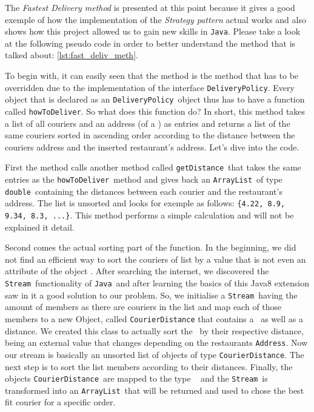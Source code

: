 The \emph{Fastest Delivery method} is presented at this point because it gives a good exemple of how the implementation of the \emph{Strategy pattern} actual works and also shows how this project allowed us to gain new skills in \lstinline|Java|. Please take a look at the following pseudo code in order to better understand the method that is talked about: 
\ref{lst:fast_deliv_meth}. 

To begin with, it can easily seen that the method is the method that has to be overridden due to the implementation of the interface \lstinline|DeliveryPolicy|. Every object that is declared as an \lstinline|DeliveryPolicy|~object thus has to have a function called \lstinline|howToDeliver|. So what does this function do? In short, this method takes a list of all couriers and an address (of a \Restaurant) as entries and returns a list of the same couriers sorted in ascending order according to the distance between the couriers address and the inserted restaurant's address. Let's dive into the code.

First the method calls another method called \lstinline|getDistance|~that takes the same entries as the \lstinline|howToDeliver|~method and gives back an \lstinline|ArrayList|~of type \lstinline|double|~containing the distances between each courier and the restaurant's address. The list is unsorted and looks for exemple as follows: \lstinline|{4.22, 8.9, 9.34, 8.3, ...}|. This method performs a simple calculation and will not be explained it detail.

Second comes the actual sorting part of the function. In the beginning, we did not find an efficient way to sort the couriers of list by a value that is not even an attribute of the object \Courier. After searching the internet, we discovered the \lstinline|Stream|~functionality of \lstinline|Java|~and after learning the basics of this Java8 extension saw in it a good solution to our problem. So, we initialise a \lstinline|Stream|~having the amount of members as there are couriers in the list and map each of those members to a new Object, called 
\lstinline|CourierDistance| that contains a \Courier~as well as a distance. We created this class to actually sort the \Courier~by their respective distance, being an external value that changes depending on the restaurants \lstinline|Address|. Now our stream is basically an unsorted list of objects of type \lstinline|CourierDistance|. The next step is to sort the list members according to their distances. Finally, the objects \lstinline|CourierDistance|~are mapped to the type \Courier~ and the \lstinline|Stream|~is transformed into an \lstinline|ArrayList|~that will be returned and used to chose the best fit courier for a specific order. 

